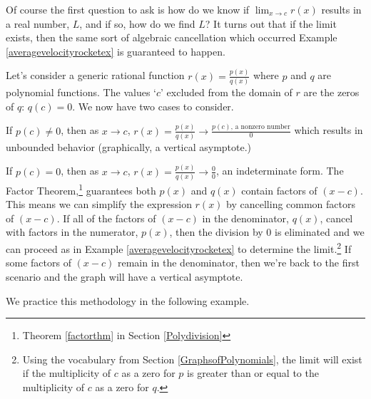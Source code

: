 \documentclass{ximera}
\begin{document}

Of course the first question to ask is how do we  know if $\lim_{x \rightarrow c} r(x)$ results in a real number, $L$, and if so, how do we find $L$?  It turns out that if the limit exists, then the same sort of algebraic cancellation which occurred  Example \ref{averagevelocityrocketex} is guaranteed to happen. 

Let's consider a generic rational function $r(x) = \frac{p(x)}{q(x)}$ where $p$ and $q$ are polynomial functions.  The values `$c$' excluded from the domain of $r$ are the zeros of $q$:  $q(c) =0$. We now have two cases to consider.   

If $p(c) \neq 0$, then as $x \rightarrow c$, $r(x)  = \frac{p(x)}{q(x)} \rightarrow \frac{\text{$p(c)$, a nonzero number}}{0}$  which results in unbounded behavior (graphically, a vertical asymptote.)


If $p(c) = 0$, then  as $x \rightarrow c$, $r(x)  = \frac{p(x)}{q(x)} \rightarrow \frac{0}{0}$, an indeterminate form.  The Factor Theorem,\footnote{Theorem \ref{factorthm} in Section \ref{Polydivision}} guarantees both $p(x)$ and $q(x)$ contain factors of $(x-c)$.  This means we can simplify the expression $r(x)$ by cancelling common factors of $(x-c)$.  If all of the factors of $(x-c)$ in the denominator, $q(x)$, cancel with factors in the numerator, $p(x)$, then the division by $0$ is eliminated and we can proceed as in Example \ref{averagevelocityrocketex} to determine the limit.\footnote{Using the vocabulary from Section \ref{GraphsofPolynomials}, the limit will exist if the multiplicity of $c$ as a zero for $p$ is greater than or equal to the multiplicity of $c$ as a zero for $q$.}  If some factors of $(x-c)$ remain in the denominator, then we're back to the first scenario and the graph will have a vertical asymptote. 

We practice this methodology in the following example.
\end{document}
